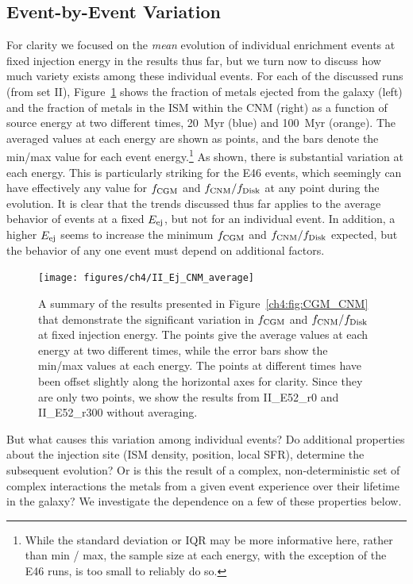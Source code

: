 \subsection{Event-by-Event Variation}

For clarity we focused on the \textit{mean} evolution of individual enrichment events at fixed injection energy in the results thus far, but we turn now to discuss how much variety exists among these individual events. For each of the discussed runs (from set II), Figure~\ref{ch4:fig:CGM_CNM_variance} shows the fraction of metals ejected from the galaxy (left) and the fraction of metals in the ISM within the CNM (right) as a function of source energy at two different times, 20~Myr (blue) and 100~Myr (orange). The averaged values at each energy are shown as points, and the bars denote the min/max value for each event energy.\footnote{While the standard deviation or IQR may be more informative here, rather than min / max, the sample size at each energy, with the exception of the E46 runs, is too small to reliably do so.} As shown, there is substantial variation at each energy. This is particularly striking for the E46 events, which seemingly can have effectively any value for $f_{\rm CGM}$ and $f_{\rm CNM} / f_{\rm Disk}$ at any point during the evolution. It is clear that the trends discussed thus far applies to the average behavior of events at a fixed $E_{\rm ej}$, but not for an individual event. In addition, a higher $E_{\rm ej}$ seems to increase the minimum $f_{\rm CGM}$ and $f_{\rm CNM} / f_{\rm Disk}$ expected, but the behavior of any one event must depend on additional factors.

 \begin{figure}
   \centering
   \texttt{[image: figures/ch4/II\_Ej\_CNM\_average]}
   \caption{A summary of the results presented in Figure~\ref{ch4:fig:CGM_CNM} that demonstrate the significant variation in $f_{\rm CGM}$ and
   $f_{\rm CNM} / f_{\rm Disk}$ at fixed injection energy. The points give the average values at each energy at two different times, while the
   error bars show the min/max values at each energy. The points at different times have been offset slightly along the horizontal axes for clarity. Since they are only two points, we show the results from II_E52_r0 and II_E52_r300 without averaging.}
   \label{ch4:fig:CGM_CNM_variance}
 \end{figure}

But what causes this variation among individual events? Do additional properties about the injection site (ISM density, position, local SFR), determine the subsequent evolution? Or is this the result of a complex, non-deterministic set of complex interactions the metals from a given event experience over their lifetime in the galaxy? We investigate the dependence on a few of these properties below.

